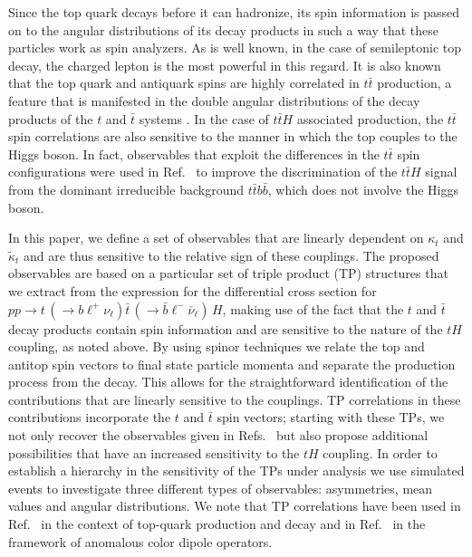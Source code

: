 \documentclass[aps,preprint,tightenlines,floatfix,superscriptaddress,nofootinbib,showpacs]{revtex4-1}
\def\tbar{\bar{t}}
\def\bbar{\bar{b}}
\def\nubar{{\bar{\nu}}_{\ell}}
\def\ppprocess{pp\to t\,\left(\rightarrow b {\ell}^+ \nu_{\ell}\right) \tbar\,\left(\rightarrow\bbar {\ell}^-\nubar\right)\,H}
\def\kp{\kappa_t}
\def\kpt{\tilde{\kappa}_t}
\begin{document}
Since the top quark decays before it can hadronize, its spin
information is passed on to the angular distributions of its decay
products in such a way that these particles work as spin analyzers.
As is well known, in the case of semileptonic top decay,
the charged lepton is the most powerful in this regard.
It is also known that the top quark and antiquark spins
are highly correlated in $t\tbar$ production,
a feature that
is manifested in the double angular distributions of the decay
products of the $t$ and $\tbar$ systems \cite{Mahlon1,*Mahlon2,*Mahlon3,*atwood}.
In the case of
$t\tbar H$ associated production, the $t\tbar$ spin correlations
are also sensitive to the manner in which
the top couples to the Higgs boson. 
In fact, observables that exploit
the differences in the $t\tbar$ spin configurations were used in
Ref.~\cite{Biswas} to improve the discrimination of the $t\tbar H$ signal
from the dominant irreducible background $t\tbar b\bbar$, which does not
involve the Higgs boson. 

In this paper, we define a set of observables that are linearly dependent on
$\kp$ and $\kpt$ and are thus sensitive to the relative sign of these
couplings. The proposed observables are based on a particular set of
triple product (TP) structures that we extract from the
expression for the differential cross section for $\ppprocess$,
making use of the fact that the $t$ and $\tbar$ decay products
contain spin information and are sensitive to the
nature of the $tH$ coupling, as noted above.
By using spinor techniques we relate the top
and antitop spin vectors to final state particle
momenta and separate the production process from the decay. This
allows for the straightforward identification of the contributions
that are linearly
sensitive to the couplings.
TP correlations in these
contributions incorporate the $t$ and $\tbar$ spin vectors; starting
with these TPs, we not only recover the observables given in
Refs.~\cite{Ellis,Guadagnoli} but also propose additional possibilities that
have an increased sensitivity to the $tH$ coupling.
In order to establish a hierarchy in the
sensitivity of the TPs under analysis we use simulated events
to investigate three different
types of observables: asymmetries, mean
values and angular distributions. We note that TP correlations have
been used in Ref.~\cite{Valencia1,*Valencia2} in the context of top-quark
production and decay and in Ref.~\cite{Valencia3} in the framework of
anomalous color dipole operators.  \par
\end{document}
